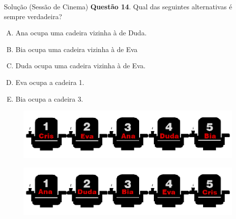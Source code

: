 \documentclass{beamer}
\begin{document}
\begin{frame}{Solução (Sessão de Cinema)}
\textbf{Questão 14}. Qual das seguintes alternativas é
sempre verdadeira?
\begin{enumerate}[(A)]
    \item Ana ocupa uma cadeira vizinha à de Duda.
    \item Bia ocupa uma cadeira vizinha à de Eva
    \item Duda ocupa uma cadeira vizinha à de Eva.
    \item Eva ocupa a cadeira 1.
    \item Bia ocupa a cadeira 3.
\end{enumerate}
        \begin{figure}[ht]
        \centering
        \includegraphics[width=.8\textwidth]{nomes 3.png}
        \label{fig:exampleFig2}
        \end{figure}
         \begin{figure}[ht]
        \centering
        \includegraphics[width=.8\textwidth]{nome6.png}
        \label{fig:exampleFig2}
        \end{figure}

\end{frame}
\end{document}
